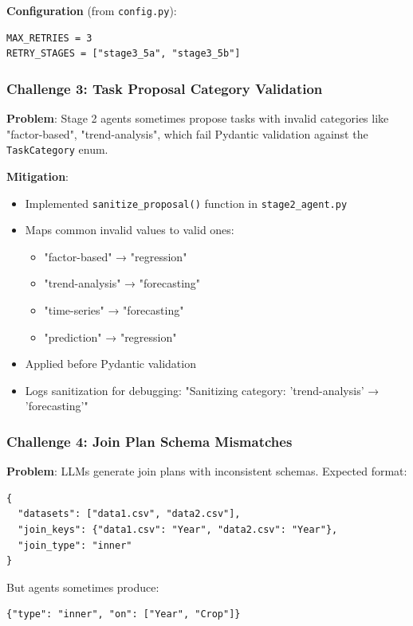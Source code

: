 \documentclass[11pt,a4paper]{article}
\begin{document}
\textbf{Configuration} (from \texttt{config.py}):
\begin{verbatim}
MAX_RETRIES = 3
RETRY_STAGES = ["stage3_5a", "stage3_5b"]
\end{verbatim}

\subsubsection{Challenge 3: Task Proposal Category Validation}

\textbf{Problem}: Stage 2 agents sometimes propose tasks with invalid categories like "factor-based", "trend-analysis", which fail Pydantic validation against the \texttt{TaskCategory} enum.

\textbf{Mitigation}:
\begin{itemize}
    \item Implemented \texttt{sanitize\_proposal()} function in \texttt{stage2\_agent.py}
    \item Maps common invalid values to valid ones:
    \begin{itemize}
        \item "factor-based" → "regression"
        \item "trend-analysis" → "forecasting"
        \item "time-series" → "forecasting"
        \item "prediction" → "regression"
    \end{itemize}
    \item Applied before Pydantic validation
    \item Logs sanitization for debugging: "Sanitizing category: 'trend-analysis' → 'forecasting'"
\end{itemize}

\subsubsection{Challenge 4: Join Plan Schema Mismatches}

\textbf{Problem}: LLMs generate join plans with inconsistent schemas. Expected format:
\begin{verbatim}
{
  "datasets": ["data1.csv", "data2.csv"],
  "join_keys": {"data1.csv": "Year", "data2.csv": "Year"},
  "join_type": "inner"
}
\end{verbatim}

But agents sometimes produce:
\begin{verbatim}
{"type": "inner", "on": ["Year", "Crop"]}
\end{verbatim}
\end{document}
